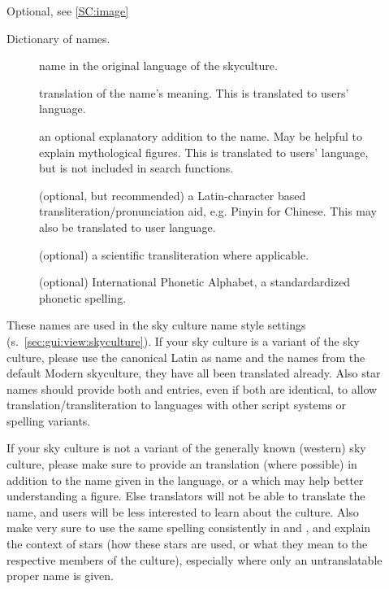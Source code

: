 \begin{description}
\item[] Optional, see \ref{SC:image}
\item[] Dictionary of names. %

	\begin{description}
	    \item[] name in the original language of the skyculture. 
	    \item[] translation of the name's meaning. This is translated to users' language.
	    \item[] an optional explanatory addition to the name.   May be helpful to explain mythological figures. This is translated to users' language, but is not included in search functions.
	    \item[] (optional, but recommended) a Latin-character based transliteration/pronunciation aid, e.g. Pinyin for Chinese. This may also be translated to user language.
	    \item[] (optional) a scientific transliteration where applicable. 
	    \item[] (optional) International Phonetic Alphabet, a standardardized phonetic spelling.
	\end{description}

	These names are used in the sky culture name style settings (s.~\ref{sec:gui:view:skyculture}). 
	If your sky culture is a variant of the  sky culture, 
	please use the canonical Latin as  name and the  names from the default Modern skyculture, they have all been translated already.
	Also star names should provide both  and  entries, even if both are identical, 
	to allow translation/transliteration to languages with other script systems or spelling variants.

	If your sky culture is not a variant of the generally known  (western)
	sky culture, please make sure to provide an  translation (where possible) in addition to the name given in
	the  language, or a  which may help better understanding a figure. Else translators will not be able to translate
	the name, and users will be less interested to learn about the culture. 
	Also make very sure to use the same spelling consistently in  and , 
	and explain the context of stars (how these stars are used, or what they mean to the respective members of the culture), 
	especially where only an untranslatable proper name is given.


\end{description}
